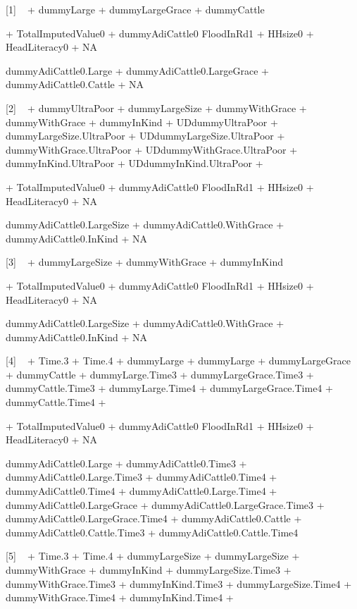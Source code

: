 \begin{Schunk}
\begin{Soutput}


[1]
 ~  + dummyLarge + dummyLargeGrace + dummyCattle

 + TotalImputedValue0
 + dummyAdiCattle0
FloodInRd1 + HHsize0 + HeadLiteracy0 + NA

dummyAdiCattle0.Large + dummyAdiCattle0.LargeGrace + dummyAdiCattle0.Cattle + NA

 

[2]
 ~  + dummyUltraPoor + dummyLargeSize + dummyWithGrace
 + dummyWithGrace + dummyInKind + UDdummyUltraPoor
 + dummyLargeSize.UltraPoor + UDdummyLargeSize.UltraPoor + dummyWithGrace.UltraPoor
 + UDdummyWithGrace.UltraPoor + dummyInKind.UltraPoor + UDdummyInKind.UltraPoor
 + 

 + TotalImputedValue0
 + dummyAdiCattle0
FloodInRd1 + HHsize0 + HeadLiteracy0 + NA

dummyAdiCattle0.LargeSize + dummyAdiCattle0.WithGrace + dummyAdiCattle0.InKind + NA

 

[3]
 ~  + dummyLargeSize + dummyWithGrace + dummyInKind

 + TotalImputedValue0
 + dummyAdiCattle0
FloodInRd1 + HHsize0 + HeadLiteracy0 + NA

dummyAdiCattle0.LargeSize + dummyAdiCattle0.WithGrace + dummyAdiCattle0.InKind + NA

 

[4]
 ~  + Time.3 + Time.4 + dummyLarge
 + dummyLarge + dummyLargeGrace + dummyCattle
 + dummyLarge.Time3 + dummyLargeGrace.Time3 + dummyCattle.Time3
 + dummyLarge.Time4 + dummyLargeGrace.Time4 + dummyCattle.Time4
 + 

 + TotalImputedValue0
 + dummyAdiCattle0
FloodInRd1 + HHsize0 + HeadLiteracy0 + NA

dummyAdiCattle0.Large + dummyAdiCattle0.Time3 + dummyAdiCattle0.Large.Time3 + dummyAdiCattle0.Time4
 + dummyAdiCattle0.Time4 + dummyAdiCattle0.Large.Time4 + dummyAdiCattle0.LargeGrace
 + dummyAdiCattle0.LargeGrace.Time3 + dummyAdiCattle0.LargeGrace.Time4 + dummyAdiCattle0.Cattle
 + dummyAdiCattle0.Cattle.Time3 + dummyAdiCattle0.Cattle.Time4

 

[5]
 ~  + Time.3 + Time.4 + dummyLargeSize
 + dummyLargeSize + dummyWithGrace + dummyInKind
 + dummyLargeSize.Time3 + dummyWithGrace.Time3 + dummyInKind.Time3
 + dummyLargeSize.Time4 + dummyWithGrace.Time4 + dummyInKind.Time4
 + 


\end{Soutput}
\end{Schunk}
